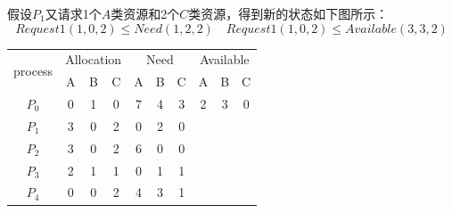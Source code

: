 \documentclass[cs4size,a4paper,10pt]{ctexart}
\begin{document}
	假设$P_1$又请求1个$A$类资源和2个$C$类资源，得到新的状态如下图所示：
	$$Request1(1,0,2)\leq Need(1,2,2) \quad Request1(1, 0, 2) \leq Available(3, 3, 2)$$
	\begin{table}[H]
	\centering
	\begin{tabular}{c|ccc|ccc|ccc}
	\hline
	\multirow{2}{*}{process} & \multicolumn{3}{c|}{Allocation} & \multicolumn{3}{c|}{Need} & \multicolumn{3}{c}{Available} \\ \cline{2-10} 
							 & A         & B        & C        & A       & B      & C      & A        & B        & C       \\ \hline
	$P_0$                    & 0         & 1        & 0        & 7       & 4      & 3      & 2        & 3        & 0       \\ \hline
	$P_1$                    & 3         & 0        & 2        & 0       & 2      & 0      &          &          &         \\ \hline
	$P_2$                    & 3         & 0        & 2        & 6       & 0      & 0      &          &          &         \\ \hline
	$P_3$                    & 2         & 1        & 1        & 0       & 1      & 1      &          &          &         \\ \hline
	$P_4$                    & 0         & 0        & 2        & 4       & 3      & 1      &          &          &         \\ \hline
	\end{tabular}
	\end{table}
\end{document}
